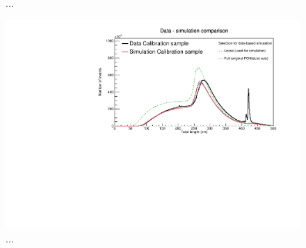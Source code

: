 \documentclass[12pt]{article}
\begin{document}
\begin{figure}[!ht]

\caption{...}
\label{figDataMCComparison_cosZstartX}
\end{figure}

\begin{figure}[!ht]
\includegraphics[clip, width=\textwidth]{DataMCComparison_TotLength.pdf}
\caption{...}
\label{figDataMCComparison_totLength}
\end{figure}
\end{document}
